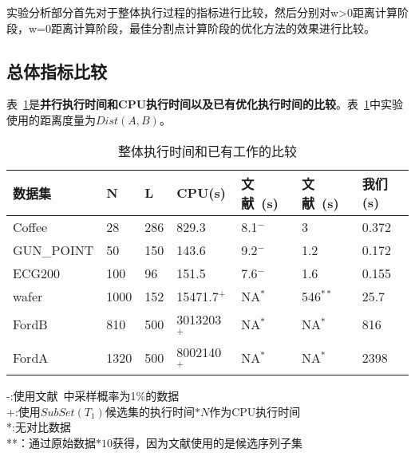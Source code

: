 实验分析部分首先对于整体执行过程的指标进行比较，然后分别对w>0距离计算阶段，w=0距离计算阶段，最佳分割点计算阶段的优化方法的效果进行比较。

\subsection{总体指标比较}
\label{cha:chap05:Analysis:Overall}

表~\ref{tab:CompareWithOthers}是\textbf{并行执行时间和CPU执行时间以及已有优化执行时间的比较}。表~\ref{tab:CompareWithOthers}中实验使用的距离度量为$Dist(A,B)$。

\begin{table}[htbp]
	\centering
	\begin{minipage}{0.9\textwidth}
		\caption{整体执行时间和已有工作的比较}
		\label{tab:CompareWithOthers}
		\begin{tabular}{p{2cm}p{1cm}p{1cm}p{1.8cm}p{1.8cm}p{1.8cm}p{1.5cm}}
			\toprule[1.5pt]
			{\heiti 数据集} & {\heiti N } &{\heiti L } &{\heiti CPU(s) } &{\heiti 文献~\cite{renard2015random}(s) } &{\heiti 文献~\cite{chang2012efficient}(s) } &{\heiti 我们(s) }
			\\\midrule[1pt]
			Coffee & 28 & 286 & 829.3 & 8.1$^-$ &  3 & 0.372 \\
			GUN\_POINT & 50 & 150 & 143.6 & 9.2$^-$ & 1.2 & 0.172 \\
			ECG200 & 100 & 96 & 151.5 & 7.6$^-$ & 1.6 & 0.155 \\
			wafer & 1000 & 152 & 15471.7$^+$ & NA$^*$ & 546$^{**}$ & 25.7 \\
			FordB & 810 & 500 & 3013203$^+$ & NA$^*$ & NA$^*$ & 816 \\
			FordA & 1320 & 500 & 8002140$^+$ & NA$^*$ & NA$^*$ &  2398\\
			\bottomrule[1.5pt]
		\end{tabular}
	    \footnotesize -:使用文献~\cite{renard2015random}中采样概率为1\%的数据 \\
		+:使用$SubSet(T_1)$候选集的执行时间$*N$作为CPU执行时间 \\
		*:无对比数据 \\
		**：通过原始数据$*10$获得，因为文献使用的是候选序列子集\\
	\end{minipage}
\end{table}

